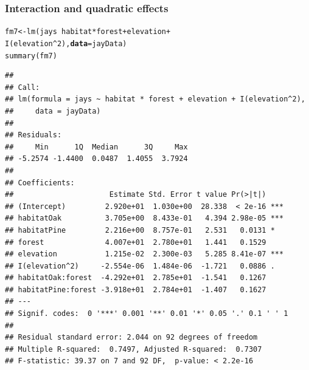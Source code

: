\documentclass[color=usenames,dvipsnames]{beamer}\usepackage[]{graphicx}\usepackage[]{color}
\makeatletter
\newcommand{\hlnum}[1]{\textcolor[rgb]{0.69,0.494,0}{#1}}%
\newcommand{\hlopt}[1]{\textcolor[rgb]{0,0,0}{#1}}%
\newcommand{\hlstd}[1]{\textcolor[rgb]{0,0,0}{#1}}%
\newcommand{\hlkwb}[1]{\textcolor[rgb]{0,0.341,0.682}{#1}}%
\newcommand{\hlkwc}[1]{\textcolor[rgb]{0,0,0}{\textbf{#1}}}%
\newcommand{\hlkwd}[1]{\textcolor[rgb]{0.004,0.004,0.506}{#1}}%
\newenvironment{kframe}{%
 \def\at@end@of@kframe{}%
 \ifinner\ifhmode%
  \def\at@end@of@kframe{\end{minipage}}%
  \begin{minipage}{\columnwidth}%
 \fi\fi%
 \def\FrameCommand##1{\hskip\@totalleftmargin \hskip-\fboxsep
 \colorbox{shadecolor}{##1}\hskip-\fboxsep
     \hskip-\linewidth \hskip-\@totalleftmargin \hskip\columnwidth}%
 \MakeFramed {\advance\hsize-\width
   \@totalleftmargin\z@ \linewidth\hsize
   \@setminipage}}%
 {\par\unskip\endMakeFramed%
 \at@end@of@kframe}
\newenvironment{knitrout}{}{} %
\makeatother
\begin{document}
\begin{frame}[fragile]
  \frametitle{Interaction and quadratic effects}
  \vspace{-2mm}
\begin{knitrout}\tiny
{}\color{fgcolor}\begin{kframe}
\begin{alltt}
\hlstd{fm7} \hlkwb{<-} \hlkwd{lm}\hlstd{(jays} \hlopt{~} \hlstd{habitat} \hlopt{*} \hlstd{forest} \hlopt{+} \hlstd{elevation} \hlopt{+}
          \hlkwd{I}\hlstd{(elevation}\hlopt{^}\hlnum{2}\hlstd{),} \hlkwc{data}\hlstd{=jayData)}
\hlkwd{summary}\hlstd{(fm7)}
\end{alltt}
\begin{verbatim}
## 
## Call:
## lm(formula = jays ~ habitat * forest + elevation + I(elevation^2), 
##     data = jayData)
## 
## Residuals:
##     Min      1Q  Median      3Q     Max 
## -5.2574 -1.4400  0.0487  1.4055  3.7924 
## 
## Coefficients:
##                      Estimate Std. Error t value Pr(>|t|)    
## (Intercept)         2.920e+01  1.030e+00  28.338  < 2e-16 ***
## habitatOak          3.705e+00  8.433e-01   4.394 2.98e-05 ***
## habitatPine         2.216e+00  8.757e-01   2.531   0.0131 *  
## forest              4.007e+01  2.780e+01   1.441   0.1529    
## elevation           1.215e-02  2.300e-03   5.285 8.41e-07 ***
## I(elevation^2)     -2.554e-06  1.484e-06  -1.721   0.0886 .  
## habitatOak:forest  -4.292e+01  2.785e+01  -1.541   0.1267    
## habitatPine:forest -3.918e+01  2.784e+01  -1.407   0.1627    
## ---
## Signif. codes:  0 '***' 0.001 '**' 0.01 '*' 0.05 '.' 0.1 ' ' 1
## 
## Residual standard error: 2.044 on 92 degrees of freedom
## Multiple R-squared:  0.7497,	Adjusted R-squared:  0.7307 
## F-statistic: 39.37 on 7 and 92 DF,  p-value: < 2.2e-16
\end{verbatim}
\end{kframe}
\end{knitrout}
\end{frame}
\end{document}
